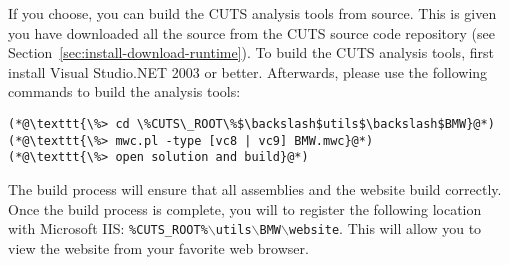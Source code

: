 If you choose, you can build the CUTS analysis tools from source. This is given 
you have downloaded all the source from the CUTS source code repository (see
Section~\ref{sec:install-download-runtime}). To build the CUTS analysis tools,
first install Visual Studio.NET 2003 or better. Afterwards, please use the following 
commands to build the analysis tools:
\begin{lstlisting}
(*@\texttt{\%> cd \%CUTS\_ROOT\%$\backslash$utils$\backslash$BMW}@*)
(*@\texttt{\%> mwc.pl -type [vc8 | vc9] BMW.mwc}@*)
(*@\texttt{\%> open solution and build}@*)
\end{lstlisting}
The build process will ensure that all assemblies and the website build correctly. 
Once the build process is complete, you will to register the following location
with Microsoft IIS: \texttt{\%CUTS\_ROOT\%$\backslash$utils$\backslash$BMW$\backslash$website}.
This will allow you to view the website from your favorite web browser.
